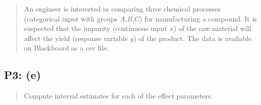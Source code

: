 \documentclass[
]{article}
\begin{document}
\begin{quote}
An engineer is interested in comparing three chemical processes
(categorical input with groups \(A\),\(B\),\(C\)) for manufacturing a
compound. It is suspected that the impurity (continuous input \(x\)) of
the raw material will affect the yield (response variable \(y\)) of the
product. The data is available on Blackboard as a csv file.
\end{quote}

\hypertarget{p3-e}{%
\subsection{P3: (e)}\label{p3-e}}

\begin{quote}
Compute interval estimates for each of the effect parameters.
\end{quote}
\end{document}
